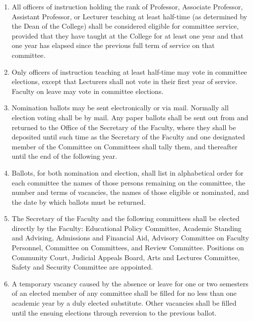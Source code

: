 \documentclass{manual}
\newcommand{\itemLevelA}{\alph*.}
\newcommand{\itemRefA}{\alph*}
\begin{document}
\begin{enumerate}[label=\itemLevelA,ref=\itemRefA]
\item All officers of instruction holding the rank of Professor, Associate Professor, Assistant Professor,  or Lecturer teaching at least half-time (as determined by the Dean of the College) shall be considered eligible for committee service, provided that they have taught at the College for at least one year and that one year has elapsed since the previous full term of service on that committee.
\item Only officers of instruction teaching at least half-time may vote in committee elections, except that Lecturers shall not vote in their first year of service. Faculty on leave may vote in committee elections.
\item Nomination ballots may be sent electronically or via mail. Normally all election voting shall be by mail. Any paper ballots shall be sent out from and returned to the Office of the Secretary of the Faculty, where they shall be deposited until such time as the Secretary of the Faculty and one designated member of the Committee on Committees shall tally them, and thereafter until the end of the following year.
\item \label{item:ballots05} Ballots, for both nomination and election, shall list in alphabetical order for each committee the names of those persons remaining on the committee, the number and terms of vacancies, the names of those eligible or nominated, and the date by which ballots must be returned.
\item The Secretary of the Faculty and the following committees shall be elected directly by the Faculty: Educational Policy Committee, Academic Standing and Advising, Admissions and Financial Aid, Advisory Committee on Faculty Personnel, Committee on Committees, and Review Committee. Positions on Community Court, Judicial Appeals Board, Arts and Lectures Committee, Safety and Security Committee are appointed.
\item A temporary vacancy caused by the absence or leave for one or two semesters of an elected member of any committee shall be filled for no less than one academic year by a duly elected substitute. Other vacancies shall be filled until the ensuing elections through reversion to the previous ballot.
\end{enumerate}

\end{document}
